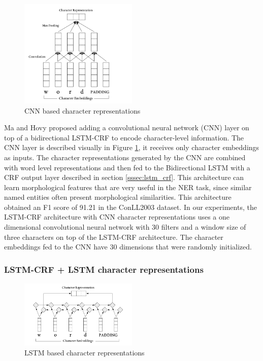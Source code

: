 \documentclass[sigconf]{acmart}
\begin{document}
\begin{figure}
  \centering
	  \includegraphics[width=0.5\textwidth]{pics/cnn}
  \caption{CNN based character representations}
  \label{fig:cnn}
\end{figure}

Ma and Hovy \cite{Ma2016} proposed adding a convolutional neural network (CNN) layer 
on top of a bidirectional LSTM-CRF to encode character-level information. The CNN
layer is described visually in Figure \ref{fig:cnn}, it receives
only character embeddings as inputs. The character representations generated by the CNN 
are combined with word level representations and then fed to the Bidirectional LSTM with
a CRF output layer described in section \ref{sssec:lstm_crf}.
This architecture can learn morphological features that are very
useful in the NER task, since similar named entities often present morphological similarities. 
This architecture obtained an F1 score of 91.21 in the ConLL2003 dataset. In our experiments, 
the LSTM-CRF architecture with CNN character representations uses a one dimensional convolutional 
neural network with 30 filters and a window size of three characters on top of the LSTM-CRF architecture.
The character embeddings fed to the CNN have 30 dimensions that were randomly initialized.

\subsubsection{LSTM-CRF + LSTM character representations}

\begin{figure}
  \centering
  \includegraphics[width=0.5\textwidth]{pics/lstm_char_representations}
  \caption{LSTM based character representations}
  \label{fig:lstm_char}
\end{figure}
\end{document}
